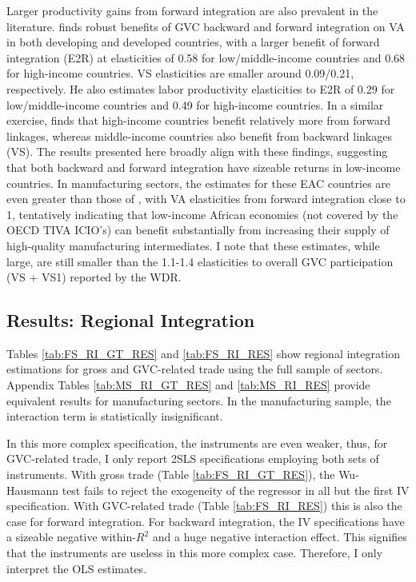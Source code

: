 \documentclass[a4paper]{article}
\begin{document}
Larger productivity gains from forward integration are also prevalent in the literature. \citet{Kummritz20161} finds robust benefits of GVC backward and forward integration on VA in both developing and developed countries, with a larger benefit of forward integration (E2R) at elasticities of 0.58 for low/middle-income countries and 0.68 for high-income countries. VS elasticities are smaller around 0.09/0.21, respectively. He also estimates labor productivity elasticities to E2R of 0.29 for low/middle-income countries and 0.49 for high-income countries. In a similar exercise, \citet{kummritz2015global} finds that high-income countries benefit relatively more from forward linkages, whereas middle-income countries also benefit from backward linkages (VS). The results presented here broadly align with these findings, suggesting that both backward and forward integration have sizeable returns in low-income countries. In manufacturing sectors, the estimates for these EAC countries are even greater than those of \citet{Kummritz20161}, with VA elasticities from forward integration close to 1, tentatively indicating that low-income African economies (not covered by the OECD TIVA ICIO's) can benefit substantially from increasing their supply of high-quality manufacturing intermediates. I note that these estimates, while large, are still smaller than the 1.1-1.4 elasticities to overall GVC participation (VS + VS1) reported by the WDR. 
 


\subsection{Results: Regional Integration}

Tables \ref{tab:FS_RI_GT_RES} and \ref{tab:FS_RI_RES} show regional integration estimations for gross and GVC-related trade using the full sample of sectors. Appendix Tables \ref{tab:MS_RI_GT_RES} and \ref{tab:MS_RI_RES} provide equivalent results for manufacturing sectors. In the manufacturing sample, the interaction term is statistically insignificant. \newline 

In this more complex specification, the instruments are even weaker, thus, for GVC-related trade, I only report 2SLS specifications employing both sets of instruments. With gross trade (Table \ref{tab:FS_RI_GT_RES}), the Wu-Hausmann test fails to reject the exogeneity of the regressor in all but the first IV specification. With GVC-related trade (Table \ref{tab:FS_RI_RES}) this is also the case for forward integration. For backward integration, the IV specifications have a sizeable negative within-$R^2$ and a huge negative interaction effect. This signifies that the instruments are useless in this more complex case. Therefore, I only interpret the OLS estimates. \newpage 
\end{document}
